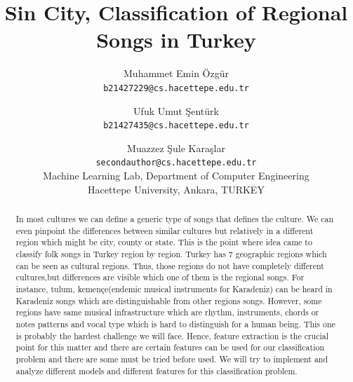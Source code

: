 \documentclass[10pt,twocolumn,letterpaper]{article}
\begin{document}
\title{Sin City, Classification of Regional Songs in Turkey}

\author{Muhammet Emin Özgür\\
{\tt\small b21427229@cs.hacettepe.edu.tr}
\and
Ufuk Umut Şentürk\\
{\tt\small b21427435@cs.hacettepe.edu.tr} \\
\and
Muazzez Şule Karaşlar\\
{\tt\small secondauthor@cs.hacettepe.edu.tr}\\
{Machine Learning Lab, Department of Computer Engineering}\\
{Hacettepe University, Ankara, TURKEY}\\
}

\maketitle
\begin{abstract}
  In most cultures we can define a generic type of songs that defines the culture. We can even pinpoint the differences between similar cultures but relatively in a different region which might be city, county or state. This is the point where idea came to classify folk songs in Turkey region by region. Turkey has 7 geographic regions which can be seen as cultural regions. Thus, those regions do not have completely different cultures,but differences are visible which one of them is the regional songs. For instance, tulum, kemençe(endemic musical instruments for Karadeniz) can be heard in Karadeniz songs which are distinguishable from other regions songs. However, some regions have same musical infrastructure which are rhythm, instruments, chords or notes patterns and vocal type which is hard to distinguish for a human being. This one is probably the hardest challenge we will face. Hence, feature extraction is the crucial point for this matter and there are certain features can be used for our classification problem and there are some must be tried before used. We will try to implement and analyze different models and different features for this classification problem.
\end{abstract}
\end{document}

